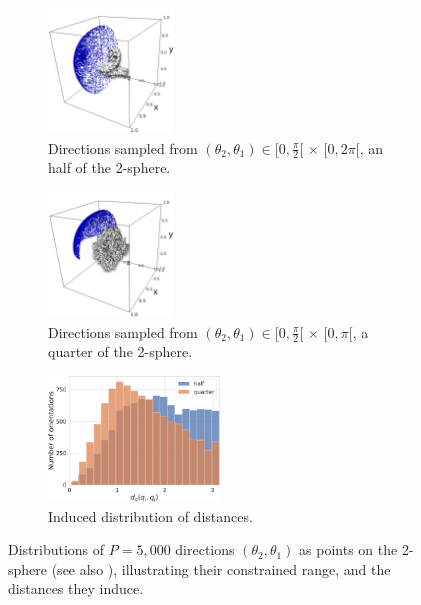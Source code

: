 \begin{figure}[ht!]
    \centering
    \begin{subfigure}[t]{0.32\linewidth}
        \centering
        \includegraphics[height=9em]{figures/5j0n-cvg.pdf}
        \caption{Directions sampled from $(\theta_2, \theta_1) \in [0,\frac{\pi}{2}[ \, \times \, [0,2\pi[$, an half of the 2-sphere.}
    \end{subfigure}
    \hfill
    \begin{subfigure}[t]{0.32\linewidth}
        \centering
        \includegraphics[height=9em]{figures/5a1a-cvg.pdf}
        \caption{Directions sampled from $(\theta_2, \theta_1) \in [0,\frac{\pi}{2}[ \, \times \, [0,\pi[$, a quarter of the 2-sphere.}
    \end{subfigure}
    \hfill
    \begin{subfigure}[t]{0.32\linewidth}
        \centering
        \includegraphics[height=9em]{figures/dQ_half_vs_quarter.pdf}
        \caption{Induced distribution of distances.}
    \end{subfigure}
    \caption{%
        Distributions of $P=5,000$ directions $(\theta_2, \theta_1)$ as points on the 2-sphere (see also ), illustrating their constrained range, and the distances they induce.
    }\label{fig:orientation-constraints}
\end{figure}

